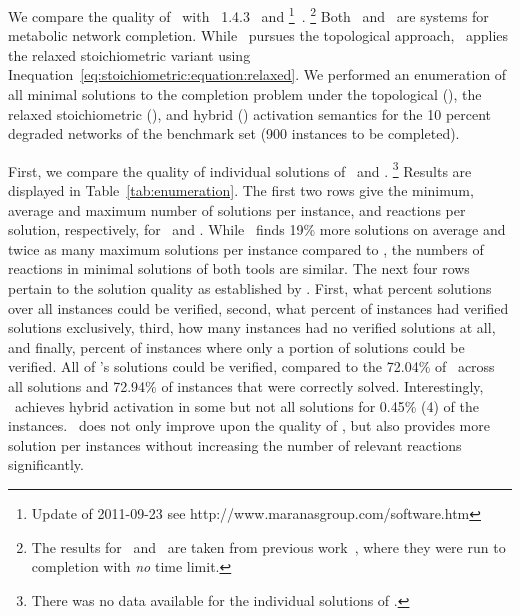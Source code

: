 We compare the quality of \fluto\ with \meneco~1.4.3~\citep{Prigent2017} and \gapfill%
\footnote{Update of 2011-09-23 see http://www.maranasgroup.com/software.htm }~\citep{SatishKumar2007}.
\footnote{The results for \meneco\ and \gapfill\ are taken from previous work~\citep{Prigent2017},
where they were run to completion with \emph{no} time limit.}
Both \meneco\ and \gapfill\ are systems for metabolic network completion.
While \meneco\ pursues the topological approach,
\gapfill\ applies the relaxed stoichiometric variant using Inequation~\eqref{eq:stoichiometric:equation:relaxed}.
We performed an enumeration of all minimal solutions to the completion problem
under the topological (\meneco), the relaxed stoichiometric (\gapfill),
and hybrid (\fluto) activation semantics for the 10 percent degraded networks of the benchmark set (900 instances to be completed).

First, we compare the quality of individual solutions of \fluto\ and \meneco.
\footnote{There was no data available for the individual solutions of \gapfill.}
Results are displayed in Table~\ref{tab:enumeration}.
The first two rows give the minimum, average and maximum number of solutions per instance,
and reactions per solution, respectively, for \fluto\ and \meneco.
While \fluto\ finds 19\% more solutions on average and twice as many maximum solutions per instance compared to \meneco,
the numbers of reactions in minimal solutions of both tools are similar.
The next four rows pertain to the solution quality as established by \cobrapy.
First, what percent solutions over all instances could be verified,
second, what percent of instances had verified solutions exclusively,
third, how many instances had no verified solutions at all,
and finally, percent of instances where only a portion of solutions could be verified.
All of \fluto's solutions could be verified,
compared to the 72.04\% of \meneco\ across all solutions and 72.94\% of instances that were correctly solved.
Interestingly, \meneco\ achieves hybrid activation in some but not all solutions for 0.45\% (4) of the instances.
\fluto\ does not only improve upon the quality of \meneco,
but also provides more solution per instances without increasing the number of relevant reactions significantly.

